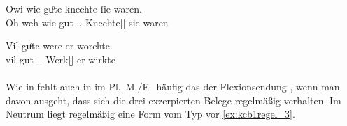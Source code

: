 \begin{exe}
\ex \label{ex:kchregel}
	\begin{xlist}
	\ex \label{ex:kchregel_1}
		\gll Owi wie guͦte knechte ſie waren. \\
			{Oh weh} wie gut-\Nom.\Pl.\St{} Knechte[\MascM] sie waren \\
		\begin{taggedline}{\parencites[\pno~2\va, 37]{kc:H}[vgl.][311]{schroeder1895}}
		\trans {}
		\end{taggedline}

	\ex \label{ex:kchregel_2}
		\gll Vil guͦte werc er worchte. \\
			vil gut-\Acc.\Pl.\St{} Werk[\NeutI] er wirkte \\
		\begin{taggedline}{\parencites[\pno~79\va, 6]{kc:H}[vgl.][13072]{schroeder1895}}
		\trans {}
		\end{taggedline}
	\end{xlist}
\end{exe}

\paragraph{\citet{kc:B1}}
Wie in \citet{kc:M} fehlt auch in \citet{kc:B1} im Pl.\ M./F.\ häufig
das  der Flexionsendung ,
wenn man davon ausgeht, dass sich die drei exzerpierten Belege regelmäßig
verhalten. Im Neutrum liegt regelmäßig eine Form vom Typ  vor
\cref{ex:kcb1regel_3}.

